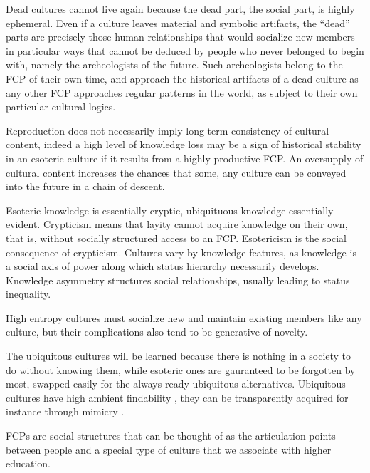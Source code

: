 \documentclass[]{book}
\theoremstyle{definition}
\theoremstyle{definition}
\theoremstyle{definition}
\theoremstyle{remark}
\begin{document}
Dead cultures cannot live again because the dead part, the social part,
is highly ephemeral. Even if a culture leaves material and symbolic
artifacts, the ``dead'' parts are precisely those human relationships
that would socialize new members in particular ways that cannot be
deduced by people who never belonged to begin with, namely the
archeologists of the future. Such archeologists belong to the FCP of
their own time, and approach the historical artifacts of a dead culture
as any other FCP approaches regular patterns in the world, as subject to
their own particular cultural logics.

Reproduction does not necessarily imply long term consistency of
cultural content, indeed a high level of knowledge loss may be a sign of
historical stability in an esoteric culture if it results from a highly
productive FCP. An oversupply of cultural content increases the chances
that some, any culture can be conveyed into the future in a chain of
descent.

Esoteric knowledge is essentially cryptic, ubiquituous knowledge
essentially evident. Crypticism means that layity cannot acquire
knowledge on their own, that is, without socially structured access to
an FCP. Esotericism is the social consequence of crypticism. Cultures
vary by knowledge features, as knowledge is a social axis of power along
which status hierarchy necessarily develops. Knowledge asymmetry
structures social relationships, usually leading to status inequality.

High entropy cultures must socialize new and maintain existing members
like any culture, but their complications also tend to be generative of
novelty.

The ubiquitous cultures will be learned because there is nothing in a
society to do without knowing them, while esoteric ones are gauranteed
to be forgotten by most, swapped easily for the always ready ubiquitous
alternatives. Ubiquitous cultures have high ambient findability
\citep{Morville2009Ambient}, they can be transparently acquired for
instance through mimicry \citep{DiMaggio1983Iron}.

FCPs are social structures that can be thought of as the articulation
points between people and a special type of culture that we associate
with higher education.
\end{document}
